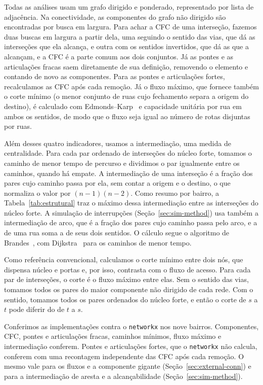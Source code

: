 Todas as análises usam um grafo dirigido e ponderado, representado por lista de
adjacência. Na conectividade, as componentes do grafo não dirigido são
encontradas por busca em largura. Para achar a CFC de uma interseção, fazemos
duas buscas em largura a partir dela, uma seguindo o sentido das vias, que dá
as interseções que ela alcança, e outra com os sentidos invertidos, que dá as
que a alcançam, e a CFC é a parte comum aos dois conjuntos. Já as pontes e as
articulações fracas saem diretamente de sua definição, removendo o elemento e
contando de novo as componentes. Para as pontes e articulações fortes,
recalculamos as CFC após cada remoção.
Já o fluxo máximo, que fornece também o corte mínimo (o menor conjunto de ruas
cujo fechamento separa a origem do destino), é calculado com
Edmonds--Karp~\cite{edmonds1972theoretical} e capacidade unitária por rua em
ambos os sentidos, de modo que o fluxo seja igual ao número de rotas disjuntas
por ruas.

Além desses quatro indicadores, usamos a intermediação, uma medida de
centralidade. Para cada par ordenado de interseções do núcleo forte, tomamos o
caminho de menor tempo de percurso e dividimos o par igualmente entre os
caminhos, quando há empate. A intermediação de uma interseção é a fração dos
pares cujo caminho passa por ela, sem contar a origem e o destino, o que
normaliza o valor por $(n-1)(n-2)$. Como resumo por bairro, a
Tabela~\ref{tab:estrutural} traz o máximo dessa intermediação entre as
interseções do núcleo forte. A simulação de interrupções
(Seção~\ref{sec:sim-method}) usa também a intermediação de arco, que é a fração
dos pares cujo caminho passa pelo arco, e a de uma rua soma a de seus dois
sentidos. O cálculo segue o algoritmo de Brandes~\cite{brandes2001faster}, com
Dijkstra~\cite{dijkstra1959note} para os caminhos de menor tempo.

Como referência convencional, calculamos o corte mínimo entre dois nós, que
dispensa núcleo e portas e, por isso, contrasta com o fluxo de acesso. Para
cada par de interseções, o corte é o fluxo máximo entre elas. Sem o sentido das
vias, tomamos todos os pares do maior componente não dirigido de cada rede. Com
o sentido, tomamos todos os pares ordenados do núcleo forte, e então o corte de
$s$ a $t$ pode diferir do de $t$ a $s$.

Conferimos as implementações contra o \texttt{networkx} nos nove bairros.
Componentes, CFC, pontes e articulações fracas, caminhos mínimos, fluxo máximo
e intermediação conferem. Pontes e articulações fortes, que o \texttt{networkx}
não calcula, conferem com uma recontagem independente das CFC após cada
remoção. O mesmo vale para os fluxos e a componente gigante
(Seção~\ref{sec:external-conn}) e para a intermediação de aresta e a
alcançabilidade (Seção~\ref{sec:sim-method}).


